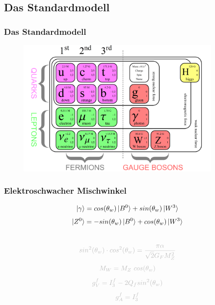 \subsection{Das Standardmodell}
 \begin{frame}
 	\frametitle{Das Standardmodell}
 	\begin{figure}
 	\begin{center}
 	  \includegraphics[width=0.9\textwidth]{graphics/SM1.png}
 	\end{center}
	\end{figure}
 \end{frame}
\begin{frame}
	\frametitle{Elektroschwacher Mischwinkel}
	\begin{center}
		\begin{equation*}
			\ket{\gamma} =  cos(\theta_w)\ket{B^0} + sin(\theta_w) \ket{W^3}
		\end{equation*}
		\begin{equation*}
		\ket{Z^0} = -sin(\theta_w) \ket{B^0} + cos(\theta_w) \ket{W^3}
		\end{equation*}\\
		\begin{equation*}
		\textcolor{lightgray}{sin^2(\theta_w)\cdot cos^2(\theta_w) = \frac{\pi\alpha}{\sqrt{2}G_FM_Z^2}}
		\end{equation*}
		\begin{equation*}
		\textcolor{lightgray}{M_W = M_Z~cos(\theta_w)}
		\end{equation*}
		\begin{equation*}
		\textcolor{lightgray}{g_V^f = I^f_3-2 Q_f sin^2(\theta_w)}
		\end{equation*}
		\begin{equation*}
		\textcolor{lightgray}{g_A^f = I^f_3}
		\end{equation*}
	\end{center}
\end{frame}
